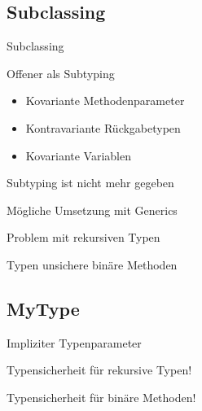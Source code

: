 \subsection{Subclassing}
\begin{frame}{Subclassing}
	\begin{bigitemize}[<+->]{3mm}
		\item Offener als Subtyping
		\begin{itemize}
			\item<1-> Kovariante Methodenparameter

			\item<1-> Kontravariante Rückgabetypen

			\item<1-> Kovariante Variablen
		\end{itemize}

		\item Subtyping ist nicht mehr gegeben

		\item Mögliche Umsetzung mit Generics

		\item Problem mit rekursiven Typen

		\item Typen unsichere binäre Methoden
	\end{bigitemize}
\end{frame}

\subsection{MyType}
\begin{frame}{\mytype}
	\begin{bigitemize}{3mm}
		\item Impliziter Typenparameter

		\item Typensicherheit für rekursive Typen!

		\item Typensicherheit für binäre Methoden!
	\end{bigitemize}
\end{frame}

